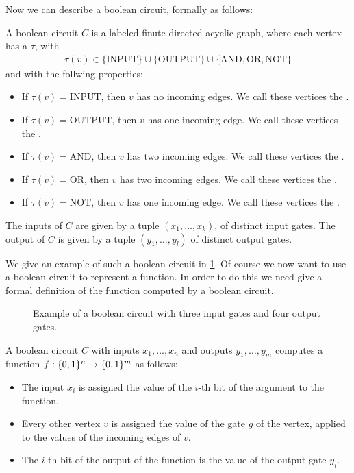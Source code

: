 Now we can describe a boolean circuit, formally as follows:
\begin{definition}
    A boolean circuit $C$ is a labeled finute directed acyclic graph, where each vertex has a  $\tau$, with
    \begin{align*}
        \tau(v) \in \{\text{INPUT}\} \cup \{\text{OUTPUT}\} \cup \{\text{AND}, \text{OR}, \text{NOT}\}
    \end{align*}
    and with the follwing properties:
    \begin{itemize}
        \item If $\tau(v) = \text{INPUT}$, then $v$ has no incoming edges. We call these vertices the .
        \item If $\tau(v) = \text{OUTPUT}$, then $v$ has one incoming edge. We call these vertices the .
        \item If $\tau(v) = \text{AND}$, then $v$ has two incoming edges. We call these vertices the .
        \item If $\tau(v) = \text{OR}$, then $v$ has two incoming edges. We call these vertices the .
        \item If $\tau(v) = \text{NOT}$, then $v$ has one incoming edge. We call these vertices the .
    \end{itemize}
    The inputs of $C$ are given by a tuple $(x_1, \dots, x_k)$, of distinct input gates. The output of $C$ is given by a tuple $(y_1, \dots, y_l)$ of distinct output gates.
\end{definition}

We give an example of such a boolean circuit in \cref{fig:boolean_circuit_example}. Of course we now want to use a boolean circuit to represent a function. In order to do this we need give a formal definition of the function computed by a boolean circuit.

\begin{figure}
    \centering
    \caption[Example of a Boolean Circuit]{Example of a boolean circuit with three input gates and four output gates.}
    \label{fig:boolean_circuit_example}
\end{figure}

\begin{definition}
    A boolean circuit $C$ with inputs $x_1, \dots, x_n$ and outputs $y_1, \dots, y_m$ computes a function $f : \{0, 1\}^n \rightarrow \{0, 1\}^m$ as follows:
    \begin{itemize}
        \item The input $x_i$ is assigned the value of the $i$-th bit of the argument to the function.
        \item Every other vertex $v$ is assigned the value of the gate $g$ of the vertex, applied to the values of the incoming edges of $v$.
        \item The $i$-th bit of the output of the function is the value of the output gate $y_i$.
    \end{itemize}
\end{definition}

